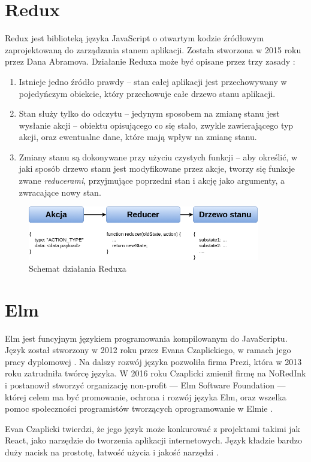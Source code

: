 \section{Redux}
Redux jest biblioteką języka JavaScript o otwartym kodzie źródłowym zaprojektowaną do zarządzania stanem aplikacji. Została stworzona w 2015 roku przez Dana Abramova. Działanie Reduxa może być opisane przez trzy zasady \cite{reduxDocs}:
\begin{enumerate}
	\item Istnieje jedno źródło prawdy -- stan całej aplikacji jest przechowywany w pojedyńczym obiekcie, który przechowuje całe drzewo stanu aplikacji.
	\item Stan służy tylko do odczytu -- jedynym sposobem na zmianę stanu jest wysłanie akcji -- obiektu opisującego co się stało, zwykle zawierającego typ akcji, oraz ewentualne dane, które mają wpływ na zmianę stanu.
	\item Zmiany stanu są dokonywane przy użyciu czystych funkcji -- aby określić, w jaki sposób drzewo stanu jest modyfikowane przez akcje, tworzy się funkcje zwane \textit{reducerami}, przyjmujące poprzedni stan i akcję jako argumenty, a zwracające nowy stan.
\end{enumerate}
\begin{figure}[h]
	\centering
	\includegraphics[width=0.9\textwidth]{images/redux_flow}
	\caption{Schemat działania Reduxa}
\end{figure}

\section{Elm}
Elm jest funcyjnym językiem programowania kompilowanym do JavaScriptu. Język został stworzony w 2012 roku przez Evana Czaplickiego, w ramach jego pracy dyplomowej \cite{elmThesis}. Na dalszy rozwój języka pozwoliła firma Prezi, która w 2013 roku zatrudniła twórcę języka. W 2016 roku Czaplicki zmienił firmę na NoRedInk i postanowił stworzyć organizację non-profit --- Elm Software Foundation --- której celem ma być promowanie, ochrona i rozwój języka Elm, oraz wszelka pomoc społeczności programistów tworzących oprogramowanie w Elmie \cite{newAdventures}.

Evan Czaplicki twierdzi, że jego język może konkurować z projektami takimi jak React, jako narzędzie do tworzenia aplikacji internetowych. Język kładzie bardzo duży nacisk na prostotę, łatwość użycia i jakość narzędzi \cite{elmGuide}.